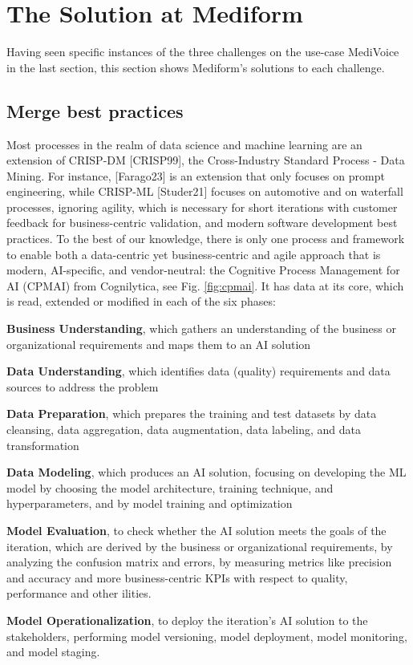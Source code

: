 \documentclass[twocolumn]{article}
\begin{document}
\section{The Solution at Mediform}

Having seen specific instances of the three challenges on the use-case MediVoice in the last section, this section shows Mediform’s solutions to each challenge.

\subsection{Merge best practices}

Most processes in the realm of data science and machine learning are an extension of CRISP-DM [CRISP99], the Cross-Industry Standard Process - Data Mining. For instance, [Farago23] is an extension that only focuses on prompt engineering, while CRISP-ML [Studer21] focuses on automotive and on waterfall processes, ignoring agility, which is necessary for short iterations with customer feedback for business-centric validation, and modern software development best practices. To the best of our knowledge, there is only one process and framework to enable both a data-centric yet business-centric and agile approach that is modern, AI-specific, and vendor-neutral: the Cognitive Process Management for AI (CPMAI) from Cognilytica, see Fig. \ref{fig:cpmai}. It has data at its core, which is read, extended or modified in each of the six phases:
\begin{compactitem}
\item {\bfseries Business Understanding}, which gathers an understanding of the business or organizational requirements and maps them to an AI solution
\item {\bfseries Data Understanding}, which identifies data (quality) requirements and data sources to address the problem
\item {\bfseries Data Preparation}, which prepares the training and test datasets by data cleansing, data aggregation, data augmentation, data labeling, and data transformation
\item {\bfseries Data Modeling}, which produces an AI solution, focusing on developing the ML model by choosing the model architecture, training technique, and hyperparameters, and by model training and optimization
\item {\bfseries Model Evaluation}, to check whether the AI solution meets the goals of the iteration, which are derived by the business or organizational requirements, by analyzing the confusion matrix and errors, by measuring metrics like precision and accuracy and more business-centric KPIs with respect to quality, performance and other ilities.
\item {\bfseries Model Operationalization}, to deploy the iteration’s AI solution to the stakeholders, performing model versioning, model deployment, model monitoring, and model staging.
\end{compactitem}
\end{document}
